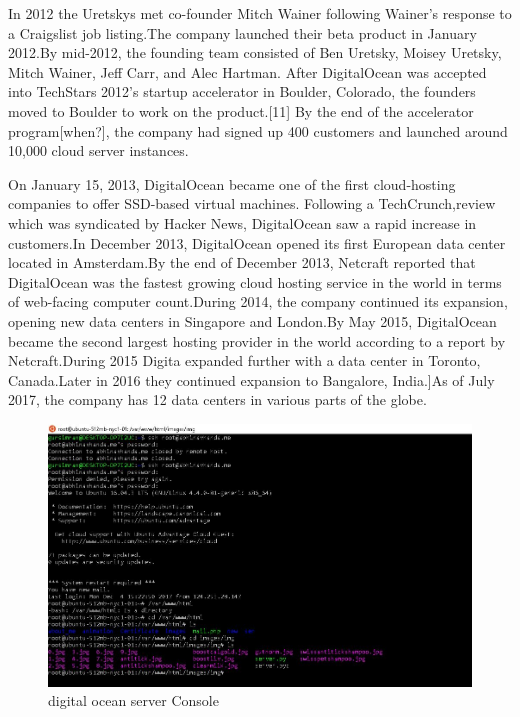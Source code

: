 In 2012 the Uretskys met co-founder Mitch Wainer following Wainer's response to a Craigslist job listing.The company launched their beta product in January 2012.By mid-2012, the founding team consisted of Ben Uretsky, Moisey Uretsky, Mitch Wainer, Jeff Carr, and Alec Hartman. After DigitalOcean was accepted into TechStars 2012's startup accelerator in Boulder, Colorado, the founders moved to Boulder to work on the product.[11] By the end of the accelerator program[when?], the company had signed up 400 customers and launched around 10,000 cloud server instances.


On January 15, 2013, DigitalOcean became one of the first cloud-hosting companies to offer SSD-based virtual machines. Following a TechCrunch,review which was syndicated by Hacker News, DigitalOcean saw a rapid increase in customers.In December 2013, DigitalOcean opened its first European data center located in Amsterdam.By the end of December 2013, Netcraft reported that DigitalOcean was the fastest growing cloud hosting service in the world in terms of web-facing computer count.During 2014, the company continued its expansion, opening new data centers in Singapore and London.By May 2015, DigitalOcean became the second largest hosting provider in the world according to a report by Netcraft.During 2015 Digita expanded further with a data center in Toronto, Canada.Later in 2016 they continued expansion to Bangalore, India.]As of July 2017, the company has 12 data centers in various parts of the globe.




\begin{figure}[ht]
\centering
\includegraphics[scale=0.40]{images/server.png}
\caption{digital ocean server Console}
\end{figure}

